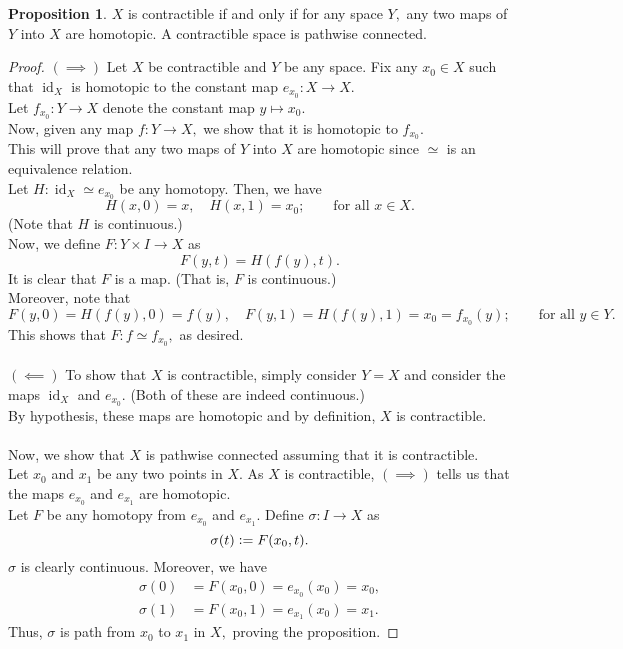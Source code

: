 \documentclass[12pt]{article}
\theoremstyle{definition}
\numberwithin{thm}{section}
\newtheorem{prop}[thm]{Proposition}
\newcommand{\id}{\operatorname{id}}
\begin{document}
\begin{prop} \label{prop:contracpathwise} %
	$X$ is contractible if and only if for any space $Y,$ any two maps of $Y$ into $X$ are homotopic. A contractible space is pathwise connected.
\end{prop}
\begin{proof} 
	$(\implies)$ Let $X$ be contractible and $Y$ be any space. Fix any $x_0 \in X$ such that $\id_X$ is homotopic to the constant map $e_{x_0}:X\to X.$ \\
	Let $f_{x_0}:Y\to X$ denote the constant map $y \mapsto x_0.$\\
	Now, given any map $f:Y\to X,$ we show that it is homotopic to $f_{x_0}.$ \\This will prove that any two maps of $Y$ into $X$ are homotopic since $\simeq$ is an equivalence relation.\\
	Let $H:\id_X \simeq e_{x_0}$ be any homotopy. Then, we have
	\begin{equation*} 
		H(x, 0) = x,\quad H(x, 1) = x_0; \qquad \text{for all } x \in X.
	\end{equation*}
	(Note that $H$ is continuous.)\\
	Now, we define $F:Y\times I \to X$ as
	\begin{equation*} 
		F(y, t) = H(f(y), t).
	\end{equation*}
	It is clear that $F$ is a map. (That is, $F$ is continuous.)\\
	Moreover, note that
	\begin{equation*} 
		F(y, 0) = H(f(y), 0) = f(y), \quad F(y, 1) = H(f(y), 1) = x_0 = f_{x_0}(y); \qquad \text{for all } y \in Y.
	\end{equation*}
	This shows that $F:f\simeq f_{x_0},$ as desired.\\~\\
	$(\impliedby)$ To show that $X$ is contractible, simply consider $Y = X$ and consider the maps $\id_X$ and $e_{x_0}.$ (Both of these are indeed continuous.)\\
	By hypothesis, these maps are homotopic and by definition, $X$ is contractible.\\~\\
	Now, we show that $X$ is pathwise connected assuming that it is contractible.\\
	Let $x_0$ and $x_1$ be any two points in $X.$ As $X$ is contractible, $(\implies)$ tells us that the maps $e_{x_0}$ and $e_{x_1}$ are homotopic. \\
	Let $F$ be any homotopy from $e_{x_0}$ and $e_{x_1}.$ Define $\sigma:I\to X$ as 
	\begin{equation*} 
		\sigma(t) \vcentcolon= F(x_0, t).
	\end{equation*}
	$\sigma$ is clearly continuous. Moreover, we have
	\begin{align*} 
		\sigma(0) &= F(x_0, 0) = e_{x_0}(x_0) = x_0,\\
		\sigma(1) &= F(x_0, 1) = e_{x_1}(x_0) = x_1.
	\end{align*}
	Thus, $\sigma$ is path from $x_0$ to $x_1$ in $X,$ proving the proposition.
\end{proof}
\end{document}
